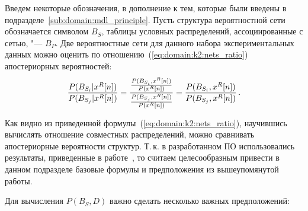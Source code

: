 Введем некоторые обозначения, в дополнение к тем, которые были введены в подразделе~\ref{sub:domain:mdl_principle}.
Пусть структура вероятностной сети обозначается символом $B_S$, таблицы условных распределений, ассоциированные с сетью, "--- $B_P$.
Две вероятностные сети для данного набора экспериментальных данных можно оценить по отношению~(\ref{eq:domain:k2:nets_ratio}) апостериорных вероятностей:
\begin{equation}
  \label{eq:domain:k2:nets_ratio}
  \frac{P(B_{S_i} | x^R[n])}{P(B_{S_j} | x^R[n])} =
    \frac{ \frac{P(B_{S_i}, x^R[n])}{P(x^R[n])} }
         { \frac{P(B_{S_j}, x^R[n])}{P(x^R[n])} } =
    \frac{ P(B_{S_i}, x^R[n]) }
         { P(B_{S_j}, x^R[n]) } \text{\,.}
\end{equation}

Как видно из приведенной формулы~(\ref{eq:domain:k2:nets_ratio}), научившись вычислять отношение совместных распределений, можно сравнивать апостериорные вероятности структур.
Т.\,к. в разработанном ПО использовались результаты, приведенные в работе~\cite{Cooper1991}, то считаем целесообразным привести в данном подразделе базовые формулы и предположения из вышеупомянутой работы.

Для вычисления $P(B_S, D)$ важно сделать несколько важных предположений:

